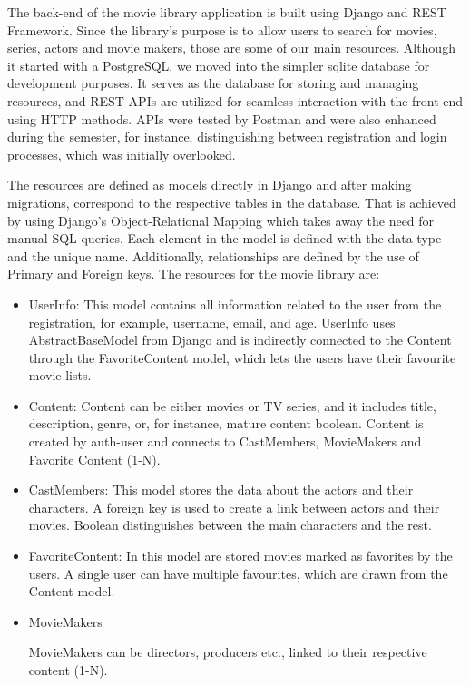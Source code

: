 \documentclass[letterpaper,twocolumn]{article}
\begin{document}
The back-end of the movie library application is built using Django and REST Framework. Since the library's purpose is to allow users to search for movies, series, actors and movie makers, those are some of our main resources. Although it started with a PostgreSQL, we moved into the simpler sqlite database for development purposes. It serves as the database for storing and managing resources, and REST APIs are utilized for seamless interaction with the front end using HTTP methods. APIs were tested by Postman and were also enhanced during the semester, for instance, distinguishing between registration and login processes, which was initially overlooked. 

The resources are defined as models directly in Django and after making migrations, correspond to the respective tables in the database. That is achieved by using Django's Object-Relational Mapping which takes away the need for manual SQL queries. Each element in the model is defined with the data type and the unique name. Additionally, relationships are defined by the use of Primary and Foreign keys. The resources for the movie library are:

\begin{itemize}
    \item UserInfo: This model contains all information related to the user from the registration, for example, username, email, and age. UserInfo uses AbstractBaseModel from Django and is indirectly connected to the Content through the FavoriteContent model, which lets the users have their favourite movie lists. 

    \item Content: Content can be either movies or TV series, and it includes title, description, genre, or, for instance, mature content boolean. Content is created by auth-user and connects to CastMembers, MovieMakers and Favorite Content (1-N).

    \item CastMembers: This model stores the data about the actors and their characters. A foreign key is used to create a link between actors and their movies. Boolean distinguishes between the main characters and the rest. 

    \item FavoriteContent: In this model are stored movies marked as favorites by the users. A single user can have multiple favourites, which are drawn from the Content model. 

    \item MovieMakers

MovieMakers can be directors, producers etc., linked to their respective content (1-N).
    
\end{itemize}
\end{document}
